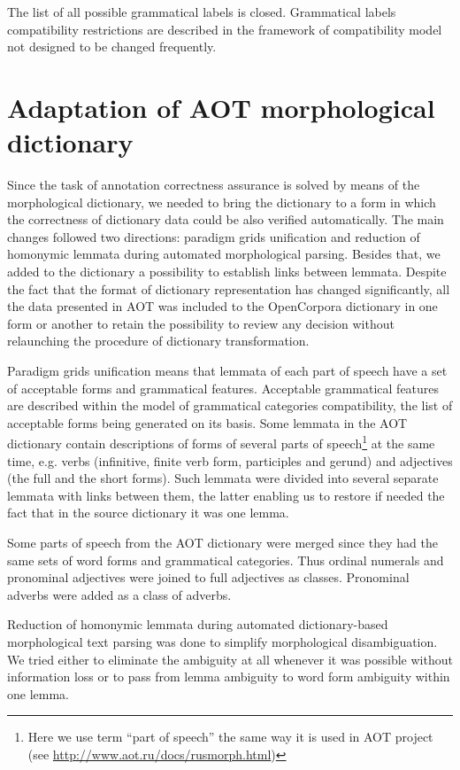 \documentclass[a4paper]{article}
\begin{document}
The list of all possible grammatical labels is closed. Grammatical labels compatibility restrictions are described in the framework of compatibility model not designed to be changed frequently.
\section{Adaptation of AOT morphological dictionary}
Since the task of annotation correctness assurance is solved by means of the morphological dictionary, we needed to bring the dictionary to a form in which the correctness of dictionary data could be also verified automatically. The main changes followed two directions: paradigm grids unification and reduction of homonymic lemmata during automated morphological parsing. Besides that, we added to the dictionary a possibility to establish links between lemmata. Despite the fact that the format of dictionary representation has changed significantly, all the data presented in AOT was included to the OpenCorpora dictionary in one form or another to retain the possibility to review any decision without relaunching the procedure of dictionary transformation.

Paradigm grids unification means that lemmata of each part of speech have a set of acceptable forms and grammatical features. Acceptable grammatical features are described within the model of grammatical categories compatibility, the list of acceptable forms being generated on its basis. Some lemmata in the AOT dictionary contain descriptions of forms of several parts of speech\footnote{Here we use term ``part of speech'' the same way it is used in AOT project (see \url{http://www.aot.ru/docs/rusmorph.html})} at the same time, e.g. verbs (infinitive, finite verb form, participles and gerund) and adjectives (the full and the short forms). Such lemmata were divided into several separate lemmata with links between them, the latter enabling us to restore if needed the fact that in the source dictionary it was one lemma.

Some parts of speech from the AOT dictionary were merged since they had the same sets of word forms and grammatical categories. Thus ordinal numerals and pronominal adjectives were joined to full adjectives as classes. Pronominal adverbs were added as a class of adverbs.

Reduction of homonymic lemmata during automated dictionary-based morphological text parsing was done to simplify morphological disambiguation. We tried either to eliminate the ambiguity at all whenever it was possible without information loss or to pass from lemma ambiguity to word form ambiguity within one lemma.
\end{document}
